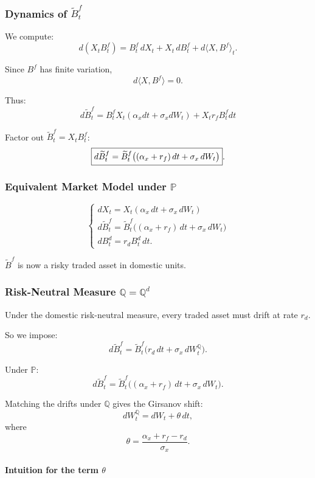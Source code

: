 \documentclass[12pt,a4paper]{article}
\theoremstyle{definition}
\begin{document}
\subsubsection{Dynamics of $\widetilde{B}_t^f$}

We compute:
\[
d(X_t B_t^f) = B_t^f\, dX_t + X_t\, dB_t^f + d\langle X, B^f \rangle_t.
\]

Since $B^f$ has finite variation,
\[
d\langle X, B^f \rangle = 0.
\]

Thus:
\[
d\widetilde{B}_t^f = B_t^f X_t(\alpha_x dt + \sigma_x dW_t) + X_t r_f B_t^f dt
\]

Factor out $\widetilde{B}_t^f = X_t B_t^f$:
\[
\fbox{$d\widetilde{B}_t^f = \widetilde{B}_t^f\big((\alpha_x + r_f)\, dt + \sigma_x\, dW_t\big)$}.
\]

\subsubsection{Equivalent Market Model under $\mathbb{P}$}

\[
\begin{cases}
dX_t = X_t(\alpha_x\, dt + \sigma_x\, dW_t) \\
d\widetilde{B}_t^f = \widetilde{B}_t^f\big((\alpha_x + r_f)\, dt + \sigma_x\, dW_t\big) \\
dB_t^d = r_d B_t^d\, dt.
\end{cases}
\]

$\widetilde{B}^f$ is now a risky traded asset in domestic units.

\subsubsection{Risk-Neutral Measure $\mathbb{Q} = \mathbb{Q}^d$}

Under the domestic risk-neutral measure, every traded asset must drift at rate $r_d$.

So we impose:
\[
d\widetilde{B}_t^f = \widetilde{B}_t^f\big(r_d\, dt + \sigma_x\, dW_t^\mathbb{Q}\big).
\]

Under $\mathbb{P}$:
\[
d\widetilde{B}_t^f = \widetilde{B}_t^f\big((\alpha_x + r_f)\, dt + \sigma_x\, dW_t\big).
\]

Matching the drifts under $\mathbb{Q}$ gives the Girsanov shift:
\[
dW_t^\mathbb{Q} = dW_t + \theta\, dt,
\]
where
\[
\theta = \frac{\alpha_x + r_f - r_d}{\sigma_x}.
\]

\paragraph{Intuition for the term $\theta$}
\end{document}
